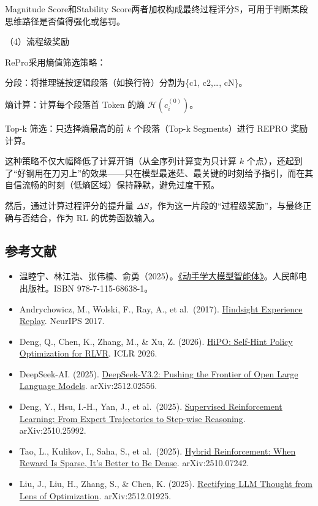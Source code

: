 Magnitude Score和Stability Score两者加权构成最终过程评分S，可用于判断某段思维路径是否值得强化或惩罚。

（4）流程级奖励

RePro采用熵值筛选策略：

分段：将推理链按逻辑段落（如换行符\n\n）分割为\{c1, c2,\ldots, cN\}。

熵计算：计算每个段落首 Token 的熵 \(\mathcal{H}(c_i^{(0)})\)。

Top-k 筛选：只选择熵最高的前 \(k\) 个段落（Top-k Segments）进行 REPRO 奖励计算。

这种策略不仅大幅降低了计算开销（从全序列计算变为只计算 \(k\) 个点），还起到了``好钢用在刀刃上''的效果------只在模型最迷茫、最关键的时刻给予指引，而在其自信流畅的时刻（低熵区域）保持静默，避免过度干预。

然后，通过计算过程评分的提升量 \(\Delta S\)，作为这一片段的``过程级奖励''，与最终正确与否结合，作为 RL 的优势函数输入。

\hypertarget{ux53c2ux8003ux6587ux732e-83}{%
\subsection{参考文献}\label{ux53c2ux8003ux6587ux732e-83}}

\vspace{0.25em}
\begin{itemize}
\tightlist
\item
  温睦宁、林江浩、张伟楠、俞勇（2025）。\href{https://haa.boyuai.com/}{《动手学大模型智能体》}。人民邮电出版社。ISBN 978-7-115-68638-1。
\item
  Andrychowicz, M., Wolski, F., Ray, A., et al.~(2017). \href{https://arxiv.org/abs/1707.01495}{Hindsight Experience Replay}. NeurIPS 2017.
\item
  Deng, Q., Chen, K., Zhang, M., \& Xu, Z. (2026). \href{https://openreview.net/forum?id=rcb20pHmT1}{HiPO: Self-Hint Policy Optimization for RLVR}. ICLR 2026.
\item
  DeepSeek-AI. (2025). \href{https://arxiv.org/abs/2512.02556}{DeepSeek-V3.2: Pushing the Frontier of Open Large Language Models}. arXiv:2512.02556.
\item
  Deng, Y., Hsu, I.-H., Yan, J., et al.~(2025). \href{https://arxiv.org/abs/2510.25992}{Supervised Reinforcement Learning: From Expert Trajectories to Step-wise Reasoning}. arXiv:2510.25992.
\item
  Tao, L., Kulikov, I., Saha, S., et al.~(2025). \href{https://arxiv.org/abs/2510.07242}{Hybrid Reinforcement: When Reward Is Sparse, It's Better to Be Dense}. arXiv:2510.07242.
\item
  Liu, J., Liu, H., Zhang, S., \& Chen, K. (2025). \href{https://arxiv.org/abs/2512.01925}{Rectifying LLM Thought from Lens of Optimization}. arXiv:2512.01925.
\end{itemize}

